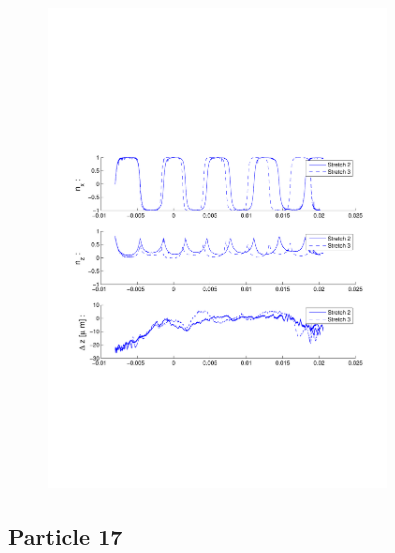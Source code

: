 \begin{figure}[H]

\centering

\includegraphics[width=0.8\textwidth]{Images/Particle 15/Stretch2.pdf}

\end{figure}


\subsection{Particle 17}

